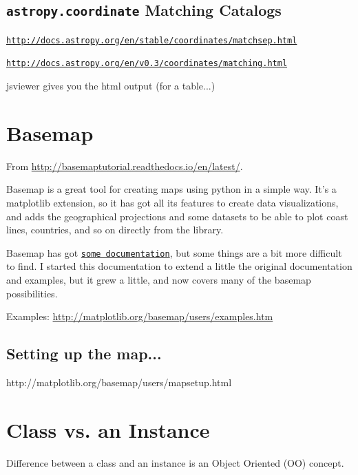 \documentclass[11pt,a4paper]{article}
\begin{document}
\subsection{{\tt astropy.coordinate} Matching Catalogs}

\smallskip
\smallskip
\noindent
\href{http://docs.astropy.org/en/stable/coordinates/matchsep.html}{\tt http://docs.astropy.org/en/stable/coordinates/matchsep.html}

\smallskip
\smallskip
\noindent
\href{http://docs.astropy.org/en/v0.3/coordinates/matching.html}{\tt http://docs.astropy.org/en/v0.3/coordinates/matching.html}

jsviewer gives you the html output (for a table...)




\newpage
\section{Basemap}
From
\href{http://basemaptutorial.readthedocs.io/en/latest/}{http://basemaptutorial.readthedocs.io/en/latest/}.

\smallskip \smallskip
\noindent 
Basemap is a great tool for creating maps using python in a simple
way. It’s a matplotlib extension, so it has got all its features to
create data visualizations, and adds the geographical projections and
some datasets to be able to plot coast lines, countries, and so on
directly from the library.

\smallskip \smallskip
\noindent 
Basemap has got
\href{http://matplotlib.org/basemap/index.html}{\tt some
documentation}, but some things are a bit more difficult to find. I
started this documentation to extend a little the original
documentation and examples, but it grew a little, and now covers many
of the basemap possibilities.

\smallskip \smallskip
\noindent
Examples:
\href{http://matplotlib.org/basemap/users/examples.html}{http://matplotlib.org/basemap/users/examples.htm}


    \subsection{Setting up the map... }
    http://matplotlib.org/basemap/users/mapsetup.html




\newpage
\section{Class vs. an Instance}
Difference between a class and an instance is an Object Oriented (OO)
concept.
\end{document}

